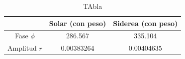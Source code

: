 		\begin{table}[H]
		\centering
		\begin{tabular}{c|c|c}
					& Solar (con peso)		& Siderea (con peso)  \\ \hline
		Fase $\phi$ & 286.567	    	& 335.104			\\
		Amplitud $r$& 0.00383264	    &0.00404635			\\
		\end{tabular}
		\caption{TAbla}
		\end{table}
		
		
		
